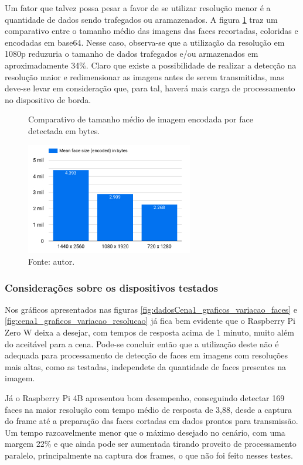Um fator que talvez possa pesar a favor de se utilizar resolução menor é a quantidade de dados sendo trafegados ou aramazenados. A figura \ref{fig:cena1_comparativo_tamanho_faces} traz um comparativo entre o tamanho médio das imagens das faces recortadas, coloridas e encodadas em base64. Nesse caso, observa-se que a utilização da resolução em 1080p reduzuria o tamanho de dados trafegados e/ou armazenados em aproximadamente 34\%. Claro que existe a possibilidade de realizar a detecção na resolução maior e redimensionar as imagens antes de serem transmitidas, mas deve-se levar em consideração que, para tal, haverá mais carga de processamento no dispositivo de borda.

\begin{figure}
    \centering
    \caption[Comparativo de tamanho médio de imagem encodada por face detectada em bytes.]{Comparativo de tamanho médio de imagem encodada por face detectada em bytes.}
    \includegraphics[width=0.65\textwidth]{Cap4_Experimentos_Realizados/Figures/cena1_graficos_tamanho_medio_imagem_face.jpg}
    \caption*{Fonte: autor.}
    \label{fig:cena1_comparativo_tamanho_faces}
\end{figure}

\subsubsection{Considerações sobre os dispositivos testados}
Nos gráficos apresentados nas figuras \ref{fig:dadosCena1_graficos_variacao_faces} e \ref{fig:cena1_graficos_variacao_resolucao} já fica bem evidente que o Raspberry Pi Zero W deixa a desejar, com tempos de resposta acima de 1 minuto, muito além do aceitável para a cena. Pode-se concluir então que a utilização deste não é adequada para processamento de detecção de faces em imagens com resoluções mais altas, como as testadas, independete da quantidade de faces presentes na imagem.

Já o Raspberry Pi 4B apresentou bom desempenho, conseguindo detectar 169 faces na maior resolução com tempo médio de resposta de 3,88, desde a captura do frame até a preparação das faces cortadas em dados prontos para transmissão. Um tempo razoavelmente menor que o máximo desejado no cenário, com uma margem 22\% e que ainda pode ser aumentada tirando proveito de processamento paralelo, principalmente na captura dos frames, o que não foi feito nesses testes.

